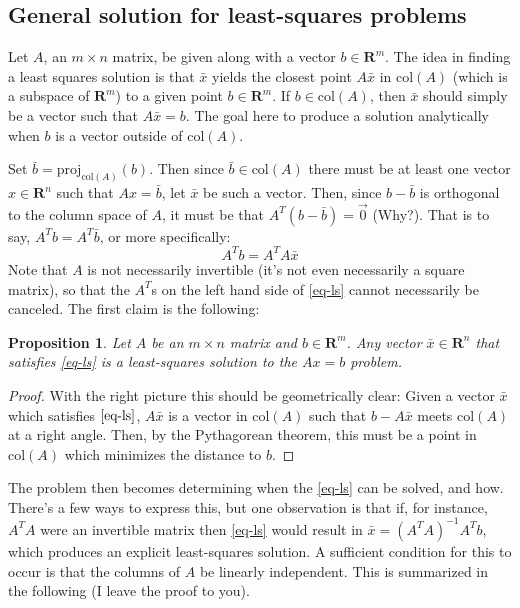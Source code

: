 \documentclass[12pt]{article}
\numberwithin{equation}{subsection}
\numberwithin{figure}{subsection}
\newtheorem{prop}[subsection]{Proposition}
\theoremstyle{note}
\newcommand{\R}{\mathbf{R}}
\newcommand\col[1]{\mathrm{col}(#1)}
\newcommand\proj[2]{\mathrm{proj}_{#1}(#2)}
\begin{document}
\subsection{General solution for least-squares problems}

Let $A$, an $m\times n$ matrix, be given along with a vector $b\in \R^m$. The idea in finding a least squares solution is that $\bar{x}$ yields the closest point $A\bar{x}$ in $\col{A}$ (which is a subspace of $\R^m$) to a given point $b\in \R^m$. If $b\in \col{A}$, then $\bar{x}$ should simply be a vector such that $A\bar{x}=b$. The goal here to produce a solution analytically when $b$ is a vector outside of $\col{A}$. 

Set $\bar{b}=\proj{\col{A}}{b}$. Then since $\bar{b}\in \col{A}$ there must be at least one vector  $x\in \R^n$ such that $Ax=\bar{b}$, let $\bar{x}$ be such a vector. Then, since $b-\bar{b}$ is orthogonal to the column space of $A$, it must be that $A^T(b-\bar{b})=\vec{0}$ (Why?). That is to say, $A^Tb=A^T\bar{b}$, or more specifically: \begin{equation} \label{eq-ls} A^Tb =A^T A\bar{x}\end{equation}Note that $A$ is not necessarily invertible (it's not even necessarily a square matrix), so that the $A^T$s on the left hand side of \eqref{eq-ls} cannot necessarily be canceled.
The first claim is the following:

\begin{prop}
Let $A$ be an $m\times n$ matrix and $b\in \R^m$. Any vector $\bar{x}\in \R^n$ that satisfies \eqref{eq-ls} is a least-squares solution to the $Ax=b$ problem.
\end{prop}

\begin{proof}
	With the right picture this should be geometrically clear: Given a vector $\bar{x}$ which satisfies $\eqref{eq-ls}$, $A\bar{x}$ is a vector in $\col{A}$ such that $b-A\bar{x}$ meets $\col{A}$ at a right angle. Then, by the Pythagorean theorem, this must be a point in $\col{A}$ which minimizes the distance to $b$.
\end{proof}

The problem then becomes determining when the \eqref{eq-ls} can be solved, and how. There's a few ways to express this, but one observation is that if, for instance, $A^TA$ were an invertible matrix then \eqref{eq-ls} would result in $\bar{x}=(A^TA)^{-1}A^Tb$, which produces an explicit least-squares solution. A sufficient condition for this to occur is that the columns of $A$ be linearly independent. This is summarized in the following (I leave the proof to you).
\end{document}
